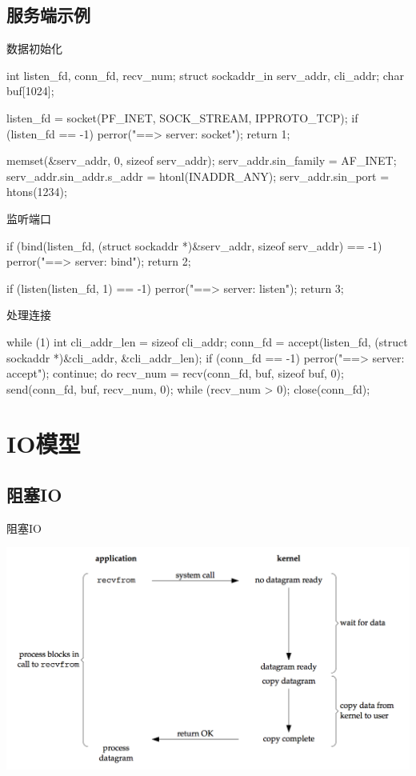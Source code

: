 \documentclass[UTF8]{beamer}
\begin{document}
\subsection{服务端示例}
\begin{frame}[fragile]{数据初始化}
  \begin{ccode}
    int listen_fd, conn_fd, recv_num;
    struct sockaddr_in serv_addr, cli_addr;
    char buf[1024];

    listen_fd = socket(PF_INET, SOCK_STREAM, IPPROTO_TCP);
    if (listen_fd == -1) {
      perror("==> server: socket");
      return 1;
    }

    memset(&serv_addr, 0, sizeof serv_addr);
    serv_addr.sin_family = AF_INET;
    serv_addr.sin_addr.s_addr = htonl(INADDR_ANY);
    serv_addr.sin_port = htons(1234);
  \end{ccode}
\end{frame}
\begin{frame}[fragile]{监听端口}
  \begin{ccode}
    if (bind(listen_fd, (struct sockaddr *)&serv_addr, sizeof serv_addr) == -1) {
      perror("==> server: bind");
      return 2;
    }

    if (listen(listen_fd, 1) == -1) {
      perror("==> server: listen");
      return 3;
    }
  \end{ccode}
\end{frame}
\begin{frame}[fragile]{处理连接}
  \begin{ccode}
    while (1) {
      int cli_addr_len = sizeof cli_addr;
      conn_fd = accept(listen_fd, (struct sockaddr *)&cli_addr, &cli_addr_len);
      if (conn_fd == -1) {
        perror("==> server: accept");
        continue;
      }
      do {
        recv_num = recv(conn_fd, buf, sizeof buf, 0);
        send(conn_fd, buf, recv_num, 0);
      } while (recv_num > 0);
      close(conn_fd);
    }
  \end{ccode}
\end{frame}
\section{IO模型}
\subsection{阻塞IO}
\begin{frame}{阻塞IO}
  \centerline{\includegraphics[width=\textwidth]{img/block.png}}
\end{frame}
\end{document}
